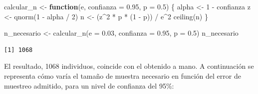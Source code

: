 \documentclass[
  spanish,
  a4paper,
]{scrreport}
\newenvironment{Shaded}{\begin{snugshade}}{\end{snugshade}}
\newcommand{\AttributeTok}[1]{\textcolor[rgb]{0.40,0.45,0.13}{#1}}
\newcommand{\ControlFlowTok}[1]{\textcolor[rgb]{0.00,0.23,0.31}{\textbf{#1}}}
\newcommand{\DecValTok}[1]{\textcolor[rgb]{0.68,0.00,0.00}{#1}}
\newcommand{\FloatTok}[1]{\textcolor[rgb]{0.68,0.00,0.00}{#1}}
\newcommand{\FunctionTok}[1]{\textcolor[rgb]{0.28,0.35,0.67}{#1}}
\newcommand{\NormalTok}[1]{\textcolor[rgb]{0.00,0.23,0.31}{#1}}
\newcommand{\OtherTok}[1]{\textcolor[rgb]{0.00,0.23,0.31}{#1}}
\newcommand{\SpecialCharTok}[1]{\textcolor[rgb]{0.37,0.37,0.37}{#1}}
\theoremstyle{definition}
\theoremstyle{definition}
\theoremstyle{remark}
\begin{document}
\begin{Shaded}
\begin{Highlighting}[]
\NormalTok{calcular\_n }\OtherTok{\textless{}{-}} \ControlFlowTok{function}\NormalTok{(e, }\AttributeTok{confianza =} \FloatTok{0.95}\NormalTok{, }\AttributeTok{p =} \FloatTok{0.5}\NormalTok{) \{}
\NormalTok{  alpha }\OtherTok{\textless{}{-}} \DecValTok{1} \SpecialCharTok{{-}}\NormalTok{ confianza}
\NormalTok{  z }\OtherTok{\textless{}{-}} \FunctionTok{qnorm}\NormalTok{(}\DecValTok{1} \SpecialCharTok{{-}}\NormalTok{ alpha }\SpecialCharTok{/} \DecValTok{2}\NormalTok{)}
\NormalTok{  n }\OtherTok{\textless{}{-}}\NormalTok{ (z}\SpecialCharTok{\^{}}\DecValTok{2} \SpecialCharTok{*}\NormalTok{ p }\SpecialCharTok{*}\NormalTok{ (}\DecValTok{1} \SpecialCharTok{{-}}\NormalTok{ p)) }\SpecialCharTok{/}\NormalTok{ e}\SpecialCharTok{\^{}}\DecValTok{2}
  \FunctionTok{ceiling}\NormalTok{(n)}
\NormalTok{\}}

\NormalTok{n\_necesario }\OtherTok{\textless{}{-}} \FunctionTok{calcular\_n}\NormalTok{(}\AttributeTok{e =} \FloatTok{0.03}\NormalTok{, }\AttributeTok{confianza =} \FloatTok{0.95}\NormalTok{, }\AttributeTok{p =} \FloatTok{0.5}\NormalTok{)}
\NormalTok{n\_necesario}
\end{Highlighting}
\end{Shaded}

\begin{verbatim}
[1] 1068
\end{verbatim}

El resultado, 1068 individuos, coincide con el obtenido a mano. A
continuación se representa cómo varía el tamaño de muestra necesario en
función del error de muestreo admitido, para un nivel de confianza del
95\%:
\end{document}
